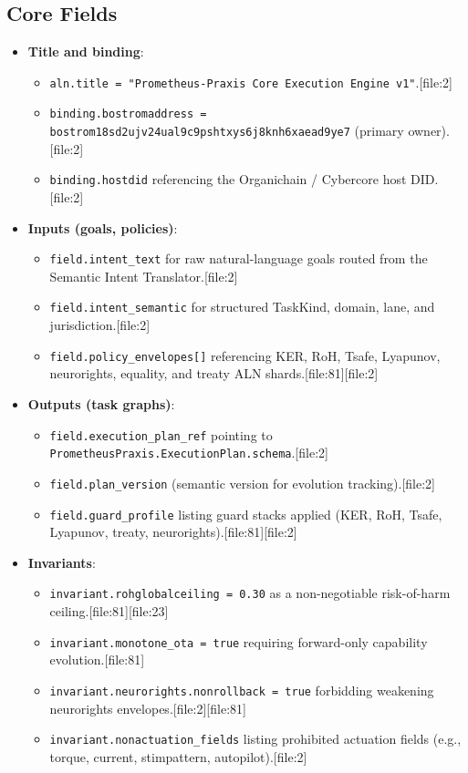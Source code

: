 \documentclass[11pt]{article}
\begin{document}
\subsection{Core Fields}

\begin{itemize}[nosep]
  \item \textbf{Title and binding}:
    \begin{itemize}[nosep]
      \item \texttt{aln.title = "Prometheus-Praxis Core Execution Engine v1"}.[file:2]
      \item \texttt{binding.bostromaddress = bostrom18sd2ujv24ual9c9pshtxys6j8knh6xaead9ye7} (primary owner).[file:2]
      \item \texttt{binding.hostdid} referencing the Organichain / Cybercore host DID.[file:2]
    \end{itemize}
  \item \textbf{Inputs (goals, policies)}:
    \begin{itemize}[nosep]
      \item \texttt{field.intent\_text} for raw natural-language goals routed from the Semantic Intent Translator.[file:2]
      \item \texttt{field.intent\_semantic} for structured TaskKind, domain, lane, and jurisdiction.[file:2]
      \item \texttt{field.policy\_envelopes[]} referencing KER, RoH, Tsafe, Lyapunov, neurorights, equality, and treaty ALN shards.[file:81][file:2]
    \end{itemize}
  \item \textbf{Outputs (task graphs)}:
    \begin{itemize}[nosep]
      \item \texttt{field.execution\_plan\_ref} pointing to \texttt{PrometheusPraxis.ExecutionPlan.schema}.[file:2]
      \item \texttt{field.plan\_version} (semantic version for evolution tracking).[file:2]
      \item \texttt{field.guard\_profile} listing guard stacks applied (KER, RoH, Tsafe, Lyapunov, treaty, neurorights).[file:81][file:2]
    \end{itemize}
  \item \textbf{Invariants}:
    \begin{itemize}[nosep]
      \item \texttt{invariant.rohglobalceiling = 0.30} as a non-negotiable risk-of-harm ceiling.[file:81][file:23]
      \item \texttt{invariant.monotone\_ota = true} requiring forward-only capability evolution.[file:81]
      \item \texttt{invariant.neurorights.nonrollback = true} forbidding weakening neurorights envelopes.[file:2][file:81]
      \item \texttt{invariant.nonactuation\_fields} listing prohibited actuation fields (e.g., torque, current, stimpattern, autopilot).[file:2]
    \end{itemize}
\end{itemize}
\end{document}
